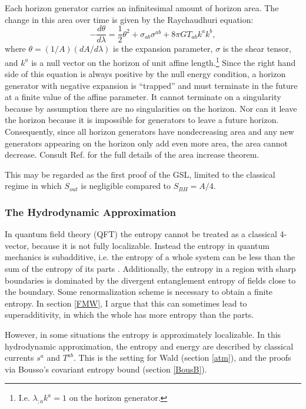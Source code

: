 \documentclass[12pt]{article}
\begin{document}
Each horizon generator carries an infinitesimal amount of horizon area.  The change in this area over time is given by the Raychaudhuri equation:
\begin{equation}\label{Ray}
-\frac{d\theta}{d\lambda} = \frac{1}{2}\theta^2 
+ \sigma_{ab}\sigma^{ab}
+ 8\pi G T_{ab}k^ak^b,
\end{equation}
where $\theta = (1/A)({dA}/{d\lambda})$ is the expansion parameter, $\sigma$ is the shear tensor, and $k^a$ is a null vector on the horizon of unit affine length.\footnote{I.e. $\lambda_{;a} k^a = 1$ on the horizon generator.}  Since the right hand side of this equation is always positive by the null energy condition, a horizon generator with negative expansion is ``trapped'' and must terminate in the future at a finite value of the affine parameter.  It cannot terminate on a singularity because by assumption there are no singularities on the horizon.  Nor can it leave the horizon because it is impossible for generators to leave a future horizon.  Consequently, since all horizon generators have nondecreasing area and any new generators appearing on the horizon only add even more area, the area cannot decrease.  Consult Ref. \cite{WALDBOOK} for the full details of the area increase theorem.

This may be regarded as the first proof of the GSL, limited to the classical regime in which $S_{out}$ is negligible compared to $S_{BH} = A/4$.

\subsubsection{The Hydrodynamic Approximation}\label{hydro}

In quantum field theory (QFT) the entropy cannot be treated as a classical 4-vector, because it is not fully localizable.  Instead the entropy in quantum mechanics is subadditive, i.e. the entropy of a whole system can be less than the sum of the entropy of its parts \cite{wehrl78}.  Additionally, the entropy in a region with sharp boundaries is dominated by the divergent entanglement entropy of fields close to the boundary.  Some renormalization scheme is necessary to obtain a finite entropy.  In section \ref{FMW}, I argue that this can sometimes lead to superadditivity, in which the whole has more entropy than the parts.

However, in some situations the entropy is approximately localizable.  In this hydrodynamic approximation, the entropy and energy are described by classical currents $s^a$ and $T^{ab}$.  This is the setting for Wald \cite{wald94} (section \ref{atm}), and the proofs via Bousso's covariant entropy bound \cite{FMW00}\cite{BFM03} (section \ref{BousB}).
\end{document}
